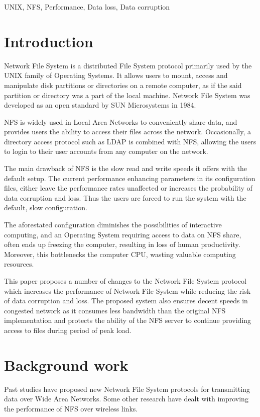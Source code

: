 \documentclass[conference]{IEEEtran}
\begin{document}
\begin{IEEEkeywords}
UNIX,
NFS,
Performance,
Data loss,
Data corruption
\end{IEEEkeywords}

\section{Introduction}
Network File System is a distributed File System protocol primarily used by the  
UNIX family of Operating Systems. It allows users to mount, access and
manipulate disk partitions or directories on a remote computer, as if the
said partition or directory was a part of the local machine. Network File
System was developed as an open standard by SUN Microsystems in 1984\cite{b1}.

NFS is widely used in Local Area Networks to conveniently share data, and
provides users the ability to access their files across the network.
Occasionally, a directory access protocol such as LDAP is combined with NFS,
allowing the users to login to their user accounts from any computer on the 
network.

The main drawback of NFS is the slow read and write speeds it offers with 
the default setup. The current performance enhancing parameters in its 
configuration files, either leave the performance rates unaffected or 
increases the probability of data corruption and loss. Thus the users are 
forced to run the system with the default, slow configuration.

The aforestated configuration diminishes the possibilities of interactive 
computing, and an Operating System requiring access to data on NFS share, 
often ends up freezing the computer, resulting in loss of human productivity.
Moreover, this bottlenecks the computer CPU, wasting valuable computing 
resources. 

This paper proposes a number of changes to the Network File System protocol
which increases the performance of Network File System while reducing
the risk of data corruption and loss. The proposed system also ensures
decent speeds in congested network as it consumes less bandwidth than the 
original NFS implementation and protects the ability of the NFS server to
continue providing access to files during period of peak load.

\section{Background work}
Past studies have proposed new Network File System protocols for
transmitting data over Wide Area Networks. Some other research have dealt
with improving the performance of NFS over wireless links.
\end{document}
